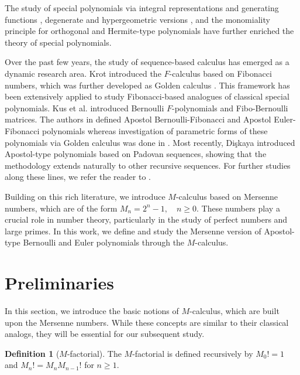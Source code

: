 \documentclass[12pt, a4paper]{article}
\theoremstyle{definition}
\newtheorem{definition}[theorem]{Definition}
\numberwithin{equation}{section}
\begin{document}
The study of special polynomials via integral representations and generating functions \cite{Cesarano2015, Cesarano2019}, degenerate and hypergeometric versions  \cite{BedoyaCes2023, CesaranoRam2022, CesRam2023, CesQuint2024, QuintRam2024, RamCeserano2022}, and the monomiality principle for orthogonal and Hermite-type polynomials \cite{CesQuintRam2024, dattoliCes2001, dattoli2001, RamCes2024, RamAlej2024} have further enriched the theory of special polynomials.


Over the past few years, the study of sequence-based calculus has emerged as a dynamic research area. Krot \cite{krot2004introduction} introduced the $F$-calculus based on Fibonacci numbers, which was further developed as Golden calculus \cite{pashaev2012golden}. This framework has been extensively applied to study Fibonacci-based analogues of classical special polynomials. Kus et al. \cite{kus2019bernoulli} introduced Bernoulli $F$-polynomials and Fibo-Bernoulli matrices. The authors in \cite{gulal2023apostol} defined Apostol Bernoulli-Fibonacci and Apostol Euler-Fibonacci polynomials whereas investigation of parametric forms of these polynomials via Golden calculus was done in \cite{kizilates2023parametric}. Most recently, Di\c{s}kaya \cite{diskaya2025apostol} introduced Apostol-type polynomials based on Padovan sequences, showing that the methodology extends naturally to other recursive sequences. For further studies along these lines, we refer the reader to \cite{duran2025FHermite, mersin2025apostol, Ramirez2024matrix, urieles2024frobenius}. 

Building on this rich literature, we introduce $M$-calculus based on Mersenne numbers, which are of the form $M_n = 2^n-1,\quad n \geq 0$. These numbers play a crucial role in number theory, particularly in the study of perfect numbers and large primes. In this work, we define and study the Mersenne version of Apostol-type Bernoulli and Euler polynomials through the $M$-calculus.

\section{Preliminaries}

In this section, we introduce the basic notions of $M$-calculus, which are built upon the Mersenne numbers. While these concepts are similar to their classical analogs, they will be essential for our subsequent study.
\begin{definition}[$M$-factorial]
The $M$-factorial is defined recursively by $M_0! = 1$ and $M_n! = M_n M_{n-1}!$ for $n\ge 1$.
\end{definition}
\end{document}
